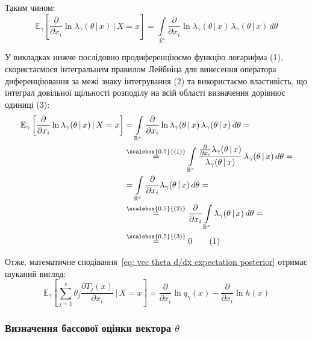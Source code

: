 Таким чином:
\begin{equation}\label{eq: vec theta d/dx ln expectation posterior}
    \mathbb{E}_{\gamma}\left[ \frac{\partial}{\partial x_i}\ln{\lambda_{\gamma}(\theta \,|\, x)} \,|\, X=x \right] = \int\limits_{\mathbb{R}^s} \frac{\partial}{\partial x_i}\ln{\lambda_{\gamma}(\theta \,|\, x)} \, \lambda_{\gamma}(\theta \,|\, x) \, d\theta
\end{equation}

У викладках нижче послідовно продиференціюємо функцію логарифма (1), скористаємося інтегральним правилом Лейбніца для винесення оператора диференціювання за межі знаку інтегрування (2) та використаємо властивість, що інтеграл довільної щільності розподілу на всій області визначення дорівнює одиниці (3): 
\begin{align*}\label{eq: Leibniz rule}
    \mathbb{E}_{\gamma}\left[ \frac{\partial}{\partial x_i}\ln{\lambda_{\gamma}(\theta \,|\, x)} \,|\, X=x \right] & = \int\limits_{\mathbb{R}^s} \frac{\partial}{\partial x_i}\ln{\lambda_{\gamma}(\theta \,|\, x)} \, \lambda_{\gamma}(\theta \,|\, x) \, d\theta = \\
    & \overset{\scalebox{0.5}{(1)}}{=} \int\limits_{\mathbb{R}^s} \frac{\frac{\partial}{\partial x_i}\lambda_{\gamma}(\theta \,|\, x)}{\lambda_{\gamma}(\theta \,|\, x)} \, \lambda_{\gamma}(\theta \,|\, x) \, d\theta = \\
    & = \int\limits_{\mathbb{R}^s} \frac{\partial}{\partial x_i}\lambda_{\gamma}(\theta \,|\, x) \, d\theta = \\
    & \overset{\scalebox{0.5}{(2)}}{=} \frac{\partial}{\partial x_i} \int\limits_{\mathbb{R}^s} \lambda_{\gamma}(\theta \,|\, x) \, d\theta = \\
    & \overset{\scalebox{0.5}{(3)}}{=} 0 \stepcounter{equation}\tag{\theequation}
\end{align*}

Отже, математичне сподівання~\eqref{eq: vec theta d/dx expectation posterior} отримає шуканий вигляд:
\begin{equation}\label{eq: vec theta d/dx final expectation posterior}
    \mathbb{E}_{\gamma}\left[ \sum\limits_{j=1}^{s}\theta_j \frac{\partial T_j(x)}{\partial x_i} \,|\, X=x \right] = \frac{\partial}{\partial x_i}\ln{q_{\gamma}(x)} - \frac{\partial}{\partial x_i}\ln{h(x)}
\end{equation}

\subsubsection*{Визначення баєсової оцінки вектора $\theta$}

